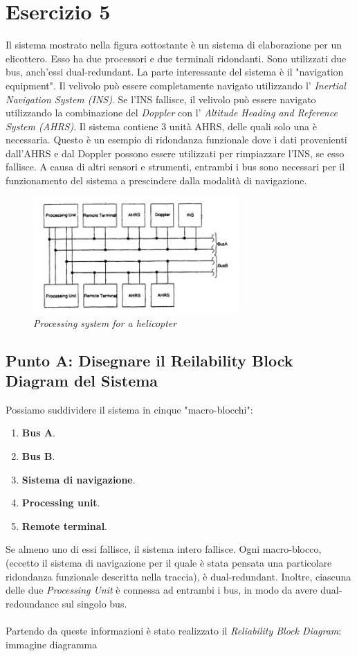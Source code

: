 \section{Esercizio 5}
Il sistema mostrato nella figura sottostante è un sistema di elaborazione per un elicottero. Esso ha due processori e due terminali ridondanti. Sono utilizzati due bus, anch'essi dual-redundant. La parte interessante del sistema è il "navigation equipment". Il velivolo può essere completamente navigato utilizzando l' \textit{Inertial Navigation System (INS)}. Se l'INS fallisce, il velivolo può essere navigato utilizzando la combinazione del \textit{Doppler} con l' \textit{Altitude Heading and Reference System (AHRS)}. Il sistema contiene 3 unità AHRS, delle quali solo una è necessaria. Questo è un esempio di ridondanza funzionale dove i dati provenienti dall'AHRS e dal Doppler possono essere utilizzati per rimpiazzare l'INS, se esso fallisce. A causa di altri sensori e strumenti, entrambi i bus sono necessari per il funzionamento del sistema a prescindere dalla modalità di navigazione.
\begin{figure}[H]
	\centering
	\includegraphics[width=0.7\textwidth]{img/hw5/es5_traccia.png}
	\caption{\textit{Processing system for a helicopter}}
\end{figure}
\subsection{Punto A: Disegnare il Reilability Block Diagram del Sistema}
Possiamo suddividere il sistema in cinque "macro-blocchi":
\begin{enumerate}
	\item \textbf{Bus A}.
	\item \textbf{Bus B}.
	\item \textbf{Sistema di navigazione}.
	\item \textbf{Processing unit}.
	\item \textbf{Remote terminal}.
\end{enumerate}
Se almeno uno di essi fallisce, il sistema intero fallisce. Ogni macro-blocco, (eccetto il sistema di navigazione per il quale è stata pensata una particolare ridondanza funzionale descritta nella traccia), è dual-redundant. Inoltre, ciascuna delle due \textit{Processing Unit} è connessa ad entrambi i bus, in modo da avere dual-redoundance sul singolo bus. 
\\
\\
Partendo da queste informazioni è stato realizzato il \textit{Reliability Block Diagram}:
\\immagine diagramma
